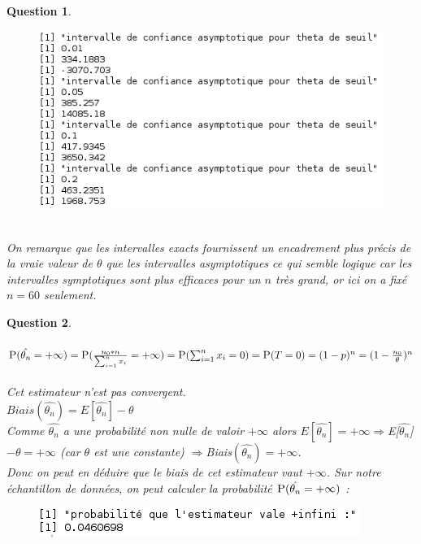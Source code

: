 \documentclass[a4paper,11pt]{article}
\newtheorem{exo1}{Question}
\begin{document}
\begin{exo1}
\begin{figure}[h]
\end{figure}
\begin{figure}[h]
\includegraphics[scale=0.7]{images/Q1_4_asymp.png}
\end{figure} \ \\
On remarque que les intervalles exacts fournissent un encadrement plus précis de la vraie valeur de $\theta$ que les intervalles asymptotiques ce qui semble logique car les intervalles symptotiques sont plus efficaces pour un $n$ très grand, or ici on a fixé $n=60$ seulement.
\end{exo1}

\begin{exo1} \ \\ \\
$\textsc{P}(\hat{\theta_{n}}=+\infty) = \textsc{P}(\frac{n_{0}*n}{\sum_{i=1}^{n} x_{i}}=+\infty) = \textsc{P}(\sum_{i=1}^{n} x_{i}=0) = \textsc{P}(T=0) = (1-p)^n = (1-\frac{n_{0}}{\theta})^n$ \ \\
Cet estimateur n'est pas convergent. \ \\
$Biais(\hat{\theta_{n}}) = E[\hat{\theta_{n}}]-\theta$ \ \\
Comme $\hat{\theta_{n}}$ a une probabilité non nulle de valoir $+\infty$ alors $E[\hat{\theta_{n}}]=+\infty \Rightarrow $E[$\hat{\theta_{n}}$]$-\theta = +\infty$ (car $\theta$ est une constante) $\Rightarrow $Biais$(\hat{\theta_{n}}) = +\infty$. \ \\
Donc on peut en déduire que le biais de cet estimateur vaut $+\infty$.
Sur notre échantillon de données, on peut calculer la probabilité $\textsc{P}(\hat{\theta_{n}}=+\infty)$ :
\begin{figure}[h]
\includegraphics[scale=0.7]{images/Q1_5.png}
\end{figure} \ \\
\end{exo1}
\end{document}
